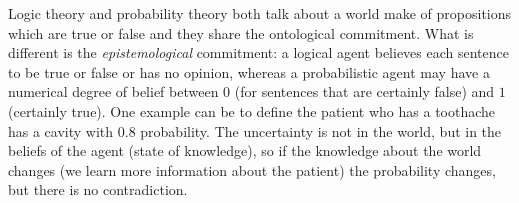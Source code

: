 Logic theory and probability theory both talk about a world make of propositions which
are true or false and they share the ontological commitment.
What is different is the \emph{epistemological} commitment: a logical agent believes each
sentence to be true or false or has no opinion, whereas a probabilistic agent 
may have a numerical degree of belief between $0$ (for sentences that are certainly false)
and $1$ (certainly true).\newline
One example can be to define the patient who has a toothache 
has a cavity with $0.8$ probability.\newline
The uncertainty is not in the world, but in the beliefs of the agent (state of knowledge),
so if the knowledge about the world changes (we learn more information about the
patient) the probability changes, but there is no contradiction.

